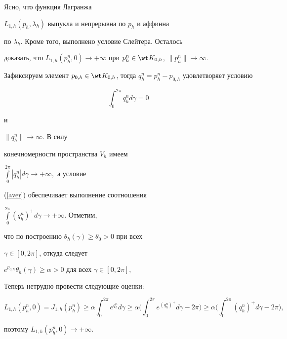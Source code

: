 \begin{pf}


Ясно, что функция Лагранжа


$L_{1,h}(p_h,\lambda_h)$ выпукла и непрерывна по $p_h$ и аффинна


по $\lambda_h$. Кроме того, выполнено условие Слейтера. Осталось


доказать, что $L_{1,h}(p_h^n,0)\to +\infty$ при $p_h^n\in


\wt K_{0,h}$, $\| p_h^n\|\to \infty$.





Зафиксируем элемент $p_{0,h}\in \wt


K_{0,h}$, тогда $q_h^n=p_h^n-p_{0,h}$ удовлетворяет условию


\begin{equation}\label {aver}


\int_{0}^{2\pi}q_h^n d\gamma=0


\end{equation}


и


$\| q_h^n\|\to \infty$. В силу


конечномерности пространства $V_h$ имеем


$\int\limits_{0}^{2\pi}|q_h^n| d\gamma\to +\infty,$ а условие


(\ref{aver}) обеспечивает выполнение соотношения


$\int\limits_{0}^{2\pi}(q_h^n)^{+} d\gamma\to +\infty$. Отметим,


что по построению $\theta_h(\gamma)\geq \theta_0>0$ при всех


$\gamma\in [0, 2\pi]$, откуда следует


$e^{p_{0,h}} \theta_h(\gamma)\geq \alpha>0$ для всех $\gamma\in [0, 2\pi]$,





Теперь нетрудно провести следующие оценки:


$$


L_{1,h}(p_h^n,0)=J_{1,h}(p_h^n)\geq \alpha


\int_{0}^{2\pi}e^{q_h^n} d\gamma \geq \alpha


\bigg(\int_{0}^{2\pi}e^{(q_h^n)^{+}} d\gamma-2\pi\bigg) \geq 


\alpha \bigg(\int_{0}^{2\pi}(q_h^n)^{+} d\gamma-2\pi\bigg),


$$


поэтому $L_{1,h}(p_h^n,0)\to +\infty$.


\end{pf}





